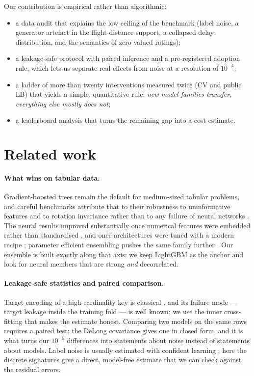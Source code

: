 \documentclass[10pt,a4paper]{article}
\begin{document}
Our contribution is empirical rather than algorithmic:
\begin{itemize}\itemsep1pt
\item a data audit that explains the low ceiling of the benchmark (label noise, a
      generator artefact in the flight-distance support, a collapsed delay distribution,
      and the semantics of zero-valued ratings);
\item a leakage-safe protocol with paired inference and a pre-registered adoption rule, which
      lets us separate real effects from noise at a resolution of $10^{-4}$;
\item a ladder of more than twenty interventions measured twice (CV and public LB) that yields a
      simple, quantitative rule: \emph{new model families transfer, everything else mostly does
      not};
\item a leaderboard analysis that turns the remaining gap into a cost estimate.
\end{itemize}

\section{Related work}

\paragraph{What wins on tabular data.} Gradient-boosted trees remain the default for
medium-sized tabular problems, and careful benchmarks attribute that to their robustness to
uninformative features and to rotation invariance rather than to any failure of neural
networks \citep{grinsztajn2022,shwartzziv2022}. The neural results improved substantially once
numerical features were embedded rather than standardised \citep{gorishniy2022}, and once
architectures were tuned with a modern recipe \citep{gorishniy2021,holzmuller2024}; parameter
efficient ensembling pushes the same family further \citep{gorishniy2024tabm}. Our ensemble is
built exactly along that axis: we keep LightGBM as the anchor and look for neural members that
are strong \emph{and} decorrelated.

\paragraph{Leakage-safe statistics and paired comparison.} Target encoding of a high-cardinality
key is classical \citep{miccibarreca2001}, and its failure mode --- target leakage inside the
training fold --- is well known; we use the inner cross-fitting that makes the estimate honest.
Comparing two models on the same rows requires a paired test; the DeLong covariance
\citep{delong1988} gives one in closed form, and it is what turns our $10^{-5}$ differences into
statements about noise instead of statements about models. Label noise is usually estimated with
confident learning \citep{northcutt2021}; here the discrete signatures give a direct, model-free
estimate that we can check against the residual errors.
\end{document}
